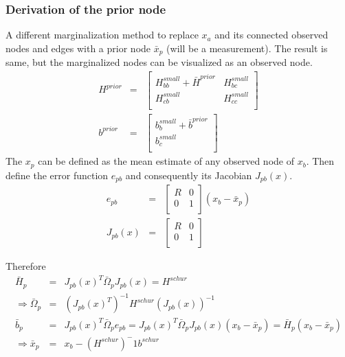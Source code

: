 \documentclass[letterpaper,10pt]{article}
\begin{document}
\subsubsection{Derivation of the prior node}
A different marginalization method to replace $x_a$ and its connected observed nodes and edges with a prior node $\bar{x}_p$ (will be a measurement). The result is same, but the marginalized nodes can be visualized as an observed node.
\begin{equation}
\begin{array}{rcl}
H^{prior} & = & \left[\begin{array}{cc}
H_{bb}^{small} + \bar{H}^{prior} & H_{bc}^{small} \\
H_{cb}^{small} & H_{cc}^{small} \\
\end{array}\right] \\
b^{prior} & = & \left[\begin{array}{c}
b_b^{small} + \bar{b}^{prior} \\
b_c^{small} \\
\end{array}\right]
\end{array}
\end{equation}
The $x_p$ can be defined as the mean estimate of any observed node of $x_b$. Then define the error function $e_{pb}$ and consequently its Jacobian $J_{pb}(x)$.
\begin{equation}
\begin{array}{rcl}
e_{pb} & = & \left[\begin{array}{cc}
R & 0 \\
0 & 1 \\
\end{array}\right] (x_b-\bar{x}_p) \\
J_{pb}(x) & = & \left[\begin{array}{cc}
R & 0 \\
0 & 1 \\
\end{array}\right]
\end{array}
\end{equation}

Therefore
\begin{equation}
\begin{array}{rcl}
\bar{H}_p & = & J_{pb}(x)^T \bar{\Omega}_p J_{pb}(x) = H^{schur}\\
\Rightarrow \bar{\Omega}_p & = & (J_{pb}(x)^T)^{-1} H^{schur} (J_{pb}(x))^{-1} \\
\bar{b}_p & = & J_{pb}(x)^T \bar{\Omega}_p e_{pb} = J_{pb}(x)^T \bar{\Omega}_p J_{pb}(x) (x_b-\bar{x}_p) = \bar{H}_p(x_b-\bar{x}_p) \\
\Rightarrow \bar{x}_p & = & x_b-(H^{schur})^-1 b^{schur} \\
\end{array}
\end{equation}
\end{document}
